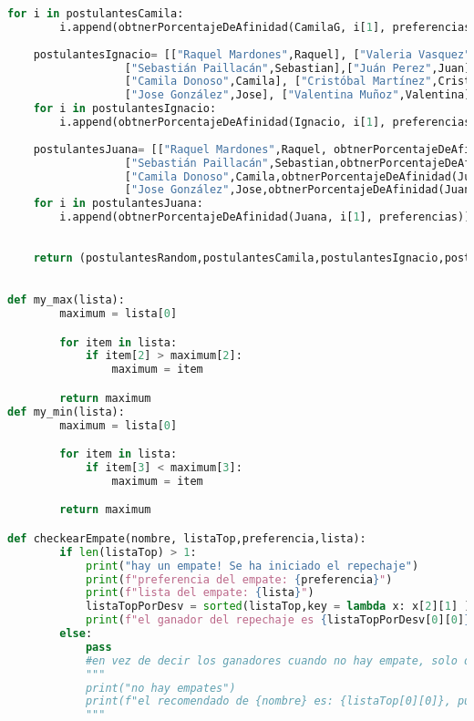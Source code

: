 \documentclass[a4paper]{article}
\begin{document}
\begin{lstlisting}[language = Python]
    for i in postulantesCamila:
        i.append(obtnerPorcentajeDeAfinidad(CamilaG, i[1], preferencias))
    
    postulantesIgnacio= [["Raquel Mardones",Raquel], ["Valeria Vasquez",Valeria], 
                  ["Sebastián Paillacán",Sebastian],["Juán Perez",Juan],
                  ["Camila Donoso",Camila], ["Cristóbal Martínez",Cristobal], 
                  ["Jose González",Jose], ["Valentina Muñoz",Valentina]]
    for i in postulantesIgnacio:
        i.append(obtnerPorcentajeDeAfinidad(Ignacio, i[1], preferencias))
    
    postulantesJuana= [["Raquel Mardones",Raquel, obtnerPorcentajeDeAfinidad(Juana,Raquel,preferencias)], ["Valeria Vasquez",Valeria, obtnerPorcentajeDeAfinidad(Juana,Valeria,preferencias)], 
                  ["Sebastián Paillacán",Sebastian,obtnerPorcentajeDeAfinidad(Juana,Sebastian,preferencias)],["Juán Perez",Juan,obtnerPorcentajeDeAfinidad(Juana,Juan,preferencias)],
                  ["Camila Donoso",Camila,obtnerPorcentajeDeAfinidad(Juana,Camila,preferencias)], ["Cristóbal Martínez",Cristobal,obtnerPorcentajeDeAfinidad(Juana,Cristobal,preferencias)], 
                  ["Jose González",Jose,obtnerPorcentajeDeAfinidad(Juana,Jose,preferencias)], ["Valentina Muñoz",Valentina,obtnerPorcentajeDeAfinidad(Juana,Valentina,preferencias)]]
    for i in postulantesJuana:
        i.append(obtnerPorcentajeDeAfinidad(Juana, i[1], preferencias))
                 
    
    return (postulantesRandom,postulantesCamila,postulantesIgnacio,postulantesJuana)

    
def my_max(lista):
        maximum = lista[0]

        for item in lista:
            if item[2] > maximum[2]:
                maximum = item

        return maximum    
def my_min(lista):
        maximum = lista[0]

        for item in lista:
            if item[3] < maximum[3]:
                maximum = item

        return maximum 

def checkearEmpate(nombre, listaTop,preferencia,lista):
        if len(listaTop) > 1:
            print("hay un empate! Se ha iniciado el repechaje")
            print(f"preferencia del empate: {preferencia}")
            print(f"lista del empate: {lista}")
            listaTopPorDesv = sorted(listaTop,key = lambda x: x[2][1] )
            print(f"el ganador del repechaje es {listaTopPorDesv[0][0]}")
        else:
            pass
            #en vez de decir los ganadores cuando no hay empate, solo dice si hay empates (que es lo que se busca)
            """
            print("no hay empates")
            print(f"el recomendado de {nombre} es: {listaTop[0][0]}, pues tiene un porcentaje de {listaTop[0][2][0]}")   
            """    
    


\end{lstlisting}
\end{document}
